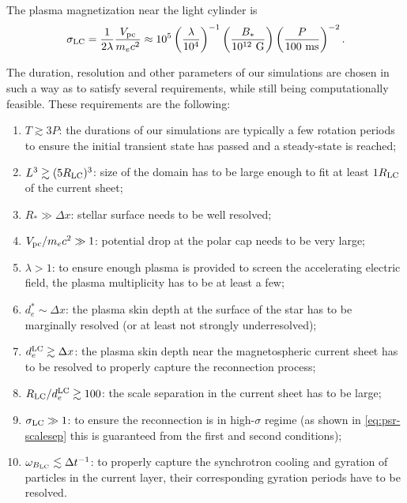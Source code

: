 The plasma magnetization near the light cylinder is
\begin{equation}
    \sigma_{\rm LC} = \frac{1}{2\lambda}\frac{V_{\rm pc}}{m_e c^2} \approx 10^5 \left(\frac{\lambda}{10^4}\right)^{-1}\left(\frac{B_*}{10^{12}~\textrm{G}}\right)\left(\frac{P}{100~\textrm{ms}}\right)^{-2}.
\end{equation}

The duration, resolution and other parameters of our simulations are chosen in such a way as to satisfy several requirements, while still being computationally feasible. These requirements are the following:
\begin{enumerate}
    \item $T\gtrsim 3 P$: the durations of our simulations are typically a few rotation periods to ensure the initial transient state has passed and a steady-state is reached;
    \item $L^3\gtrsim (5 R_{\rm LC})^3$: size of the domain has to be large enough to fit at least $1 R_{\rm LC}$ of the current sheet;
    \item $R_*\gg \Delta x$: stellar surface needs to be well resolved;
    \item $V_{\rm pc}/m_e c^2\gg 1$: potential drop at the polar cap needs to be very large;
    \item $\lambda > 1$: to ensure enough plasma is provided to screen the accelerating electric field, the plasma multiplicity has to be at least a few;
    \item $d_e^* \sim \Delta x$: the plasma skin depth at the surface of the star has to be marginally resolved (or at least not strongly underresolved);
    \item $d_e^{\rm LC}\gtrsim \Delta x$: the plasma skin depth near the magnetospheric current sheet has to be resolved to properly capture the reconnection process;
    \item $R_{\rm LC} / d_e^{\rm LC}\gtrsim 100$: the scale separation in the current sheet has to be large;
    \item $\sigma_{\rm LC}\gg 1$: to ensure the reconnection is in high-$\sigma$ regime (as shown in \eqref{eq:psr-scalesep} this is guaranteed from the first and second conditions);
    \item $\omega_{B_{\rm LC}}\lesssim \Delta t^{-1}$: to properly capture the synchrotron cooling and gyration of particles in the current layer, their corresponding gyration periods have to be resolved.
\end{enumerate}

